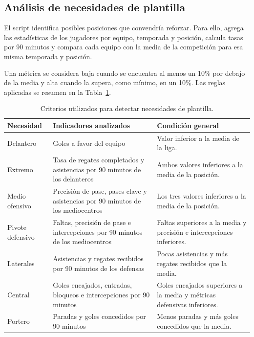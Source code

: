\subsection{Análisis de necesidades de plantilla}

El script  identifica posibles posiciones que convendría reforzar. Para ello, agrega las estadísticas de los jugadores por equipo, temporada y posición, calcula tasas por 90 minutos y compara cada equipo con la media de la competición para esa misma temporada y posición.

Una métrica se considera baja cuando se encuentra al menos un 10\% por debajo de la media y alta cuando la supera, como mínimo, en un 10\%. Las reglas aplicadas se resumen en la Tabla~\ref{tab:criterios_necesidades}.

\begin{table}[H]
\centering
\caption{Criterios utilizados para detectar necesidades de plantilla.}
\label{tab:criterios_necesidades}
\begin{tabular}{|p{2.5cm}|p{4.7cm}|p{5.7cm}|}
\hline
\textbf{Necesidad} & \textbf{Indicadores analizados} & \textbf{Condición general} \\
\hline
Delantero & Goles a favor del equipo & Valor inferior a la media de la liga. \\
\hline
Extremo & Tasa de regates completados y asistencias por 90 minutos de los delanteros & Ambos valores inferiores a la media de la posición. \\
\hline
Medio ofensivo & Precisión de pase, pases clave y asistencias por 90 minutos de los mediocentros & Los tres valores inferiores a la media de la posición. \\
\hline
Pivote defensivo & Faltas, precisión de pase e intercepciones por 90 minutos de los mediocentros & Faltas superiores a la media y precisión e intercepciones inferiores. \\
\hline
Laterales & Asistencias y regates recibidos por 90 minutos de los defensas & Pocas asistencias y más regates recibidos que la media. \\
\hline
Central & Goles encajados, entradas, bloqueos e intercepciones por 90 minutos & Goles encajados superiores a la media y métricas defensivas inferiores. \\
\hline
Portero & Paradas y goles concedidos por 90 minutos & Menos paradas y más goles concedidos que la media. \\
\hline
\end{tabular}
\end{table}

